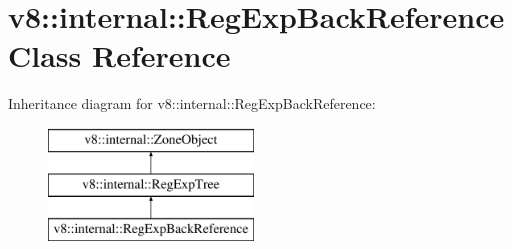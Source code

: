 \hypertarget{classv8_1_1internal_1_1RegExpBackReference}{}\section{v8\+:\+:internal\+:\+:Reg\+Exp\+Back\+Reference Class Reference}
\label{classv8_1_1internal_1_1RegExpBackReference}
Inheritance diagram for v8\+:\+:internal\+:\+:Reg\+Exp\+Back\+Reference\+:\begin{figure}[H]
\begin{center}
\leavevmode
\includegraphics[height=3.000000cm]{classv8_1_1internal_1_1RegExpBackReference}
\end{center}
\end{figure}
